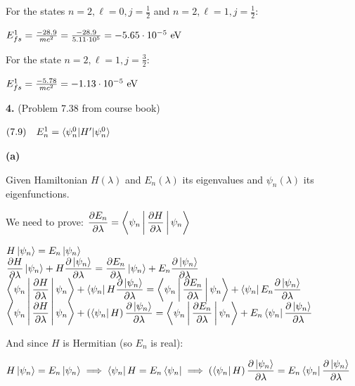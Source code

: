 \documentclass[14pt]{extarticle}
\makeatletter
\newenvironment{lefteqs}{%
    \begin{flushleft}%
    \renewcommand{\arraystretch}{1.3}%
    $\begin{array}{@{}l@{}}%
}{%
    \end{array}$%
    \end{flushleft}%
}
\makeatother
\begin{document}
For the states $n=2, \ell=0, j=\frac{1}{2}$ and $n=2, \ell=1, j=\frac{1}{2}$:

\begin{lefteqs}
    E^1_{fs} = \frac{-28.9}{mc^2} = \frac{-28.9}{5.11 \cdot 10^5} = -5.65 \cdot 10^{-5} \text{ eV}
\end{lefteqs}

For the state $n=2, \ell=1, j=\frac{3}{2}$:

\begin{lefteqs}
    E^1_{fs} = \frac{-5.78}{mc^2} = -1.13 \cdot 10^{-5} \text{ eV}
\end{lefteqs}

\newpage

\textbf{\large 4.}
(Problem 7.38 from course book)

\begin{lefteqs}
    \text{(7.9)} \quad E^1_n = \braket{\psi^0_n | H' | \psi^0_n}
\end{lefteqs}

\textbf{(a)}

Given Hamiltonian $H(\lambda)$ and $E_n(\lambda)$ its eigenvalues and $\psi_n(\lambda)$ its eigenfunctions.

We need to prove: $\dfrac{\partial E_n}{\partial \lambda} = \Braket{\psi_n | \dfrac{\partial H}{\partial \lambda} | \psi_n}$

\begin{lefteqs}
    H \ket{\psi_n} = E_n \ket{\psi_n} \\
    \dfrac{\partial H}{\partial \lambda} \ket{\psi_n} + H \dfrac{\partial \ket{\psi_n}}{\partial \lambda}
    = \dfrac{\partial E_n}{\partial \lambda} \ket{\psi_n} + E_n \dfrac{\partial \ket{\psi_n}}{\partial \lambda} \\
    \Braket{\psi_n | \dfrac{\partial H}{\partial \lambda} | \psi_n} + \bra{\psi_n} H \dfrac{\partial \ket{\psi_n}}{\partial \lambda}
    = \Braket{\psi_n | \dfrac{\partial E_n}{\partial \lambda} | \psi_n} + \bra{\psi_n} E_n \dfrac{\partial \ket{\psi_n}}{\partial \lambda} \\
    \Braket{\psi_n | \dfrac{\partial H}{\partial \lambda} | \psi_n} + \left( \bra{\psi_n} H \right) \dfrac{\partial \ket{\psi_n}}{\partial \lambda}
    = \Braket{\psi_n | \dfrac{\partial E_n}{\partial \lambda} | \psi_n} + E_n \bra{\psi_n} \dfrac{\partial \ket{\psi_n}}{\partial \lambda}
\end{lefteqs}

And since $H$ is Hermitian (so $E_n$ is real):

\begin{lefteqs}
    H \ket{\psi_n} = E_n \ket{\psi_n} \implies \bra{\psi_n} H = E_n \bra{\psi_n} \implies \left( \bra{\psi_n} H \right) \dfrac{\partial \ket{\psi_n}}{\partial \lambda} = E_n \bra{\psi_n} \dfrac{\partial \ket{\psi_n}}{\partial \lambda}
\end{lefteqs}
\end{document}

